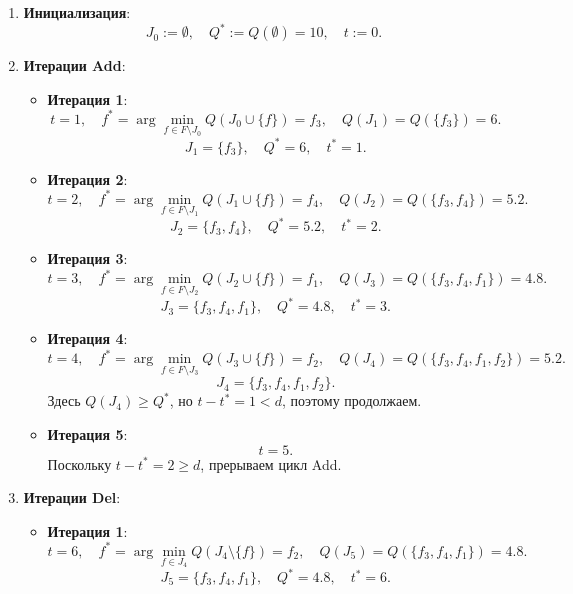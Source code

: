 \begin{enumerate}


    \item \textbf{Инициализация}:
          \[
              J_0 := \emptyset, \quad Q^* := Q(\emptyset) = 10, \quad t := 0.
          \]

    \item \textbf{Итерации Add}:
          \begin{itemize}
              \item \textbf{Итерация 1}:
                    \[
                        t = 1, \quad f^* = \arg \min_{f \in F \setminus J_0} Q(J_0 \cup \{f\}) = f_3, \quad Q(J_1) = Q(\{f_3\}) = 6.
                    \]
                    \[
                        J_1 = \{f_3\}, \quad Q^* = 6, \quad t^* = 1.
                    \]

              \item \textbf{Итерация 2}:
                    \[
                        t = 2, \quad f^* = \arg \min_{f \in F \setminus J_1} Q(J_1 \cup \{f\}) = f_4, \quad Q(J_2) = Q(\{f_3, f_4\}) = 5.2.
                    \]
                    \[
                        J_2 = \{f_3, f_4\}, \quad Q^* = 5.2, \quad t^* = 2.
                    \]

              \item \textbf{Итерация 3}:
                    \[
                        t = 3, \quad f^* = \arg \min_{f \in F \setminus J_2} Q(J_2 \cup \{f\}) = f_1, \quad Q(J_3) = Q(\{f_3, f_4, f_1\}) = 4.8.
                    \]
                    \[
                        J_3 = \{f_3, f_4, f_1\}, \quad Q^* = 4.8, \quad t^* = 3.
                    \]

              \item \textbf{Итерация 4}:
                    \[
                        t = 4, \quad f^* = \arg \min_{f \in F \setminus J_3} Q(J_3 \cup \{f\}) = f_2, \quad Q(J_4) = Q(\{f_3, f_4, f_1, f_2\}) = 5.2.
                    \]
                    \[
                        J_4 = \{f_3, f_4, f_1, f_2\}.
                    \]
                    Здесь \( Q(J_4) \geq Q^* \), но \( t - t^* = 1 < d \), поэтому продолжаем.

              \item \textbf{Итерация 5}:
                    \[
                        t = 5.
                    \]
                    Поскольку \( t - t^* = 2 \geq d \), прерываем цикл Add.
          \end{itemize}

    \item \textbf{Итерации Del}:
          \begin{itemize}
              \item \textbf{Итерация 1}:
                    \[
                        t = 6, \quad f^* = \arg \min_{f \in J_4} Q(J_4 \setminus \{f\}) = f_2, \quad Q(J_5) = Q(\{f_3, f_4, f_1\}) = 4.8.
                    \]
                    \[
                        J_5 = \{f_3, f_4, f_1\}, \quad Q^* = 4.8, \quad t^* = 6.
                    \]


\end{itemize}
\end{enumerate}
